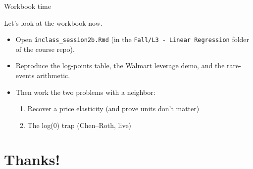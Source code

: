 \documentclass[aspectratio=169,11pt]{beamer}
\begin{document}
\begin{frame}{Workbook time}
\begin{center}
{\LARGE \alert{Let's look at the workbook now.}}
\end{center}
\bigskip
\begin{itemize}
	\item Open \texttt{inclass\_session2b.Rmd} (in the \texttt{Fall/L3 - Linear Regression} folder of the course repo).
	\item Reproduce the log-points table, the Walmart leverage demo, and the rare-events arithmetic.
	\item Then work the two problems with a neighbor:
	\begin{enumerate}
		\item Recover a price elasticity (and prove units don't matter)
		\item The log(0) trap (Chen--Roth, live)
	\end{enumerate}
\end{itemize}
\end{frame}


\section{Thanks!}
\end{document}
